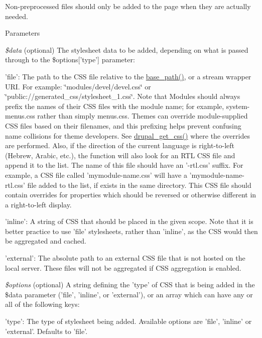 Non-\/preprocessed files should only be added to the page when they are actually needed.


\begin{DoxyParams}{Parameters}
\item[{\em \$data}](optional) The stylesheet data to be added, depending on what is passed through to the \$options\mbox{[}'type'\mbox{]} parameter:
\begin{DoxyItemize}
\item 'file': The path to the CSS file relative to the \hyperlink{common_8inc_ae227697e9c239f09fd7e36f71afde771}{base\_\-path()}, or a stream wrapper URI. For example: \char`\"{}modules/devel/devel.css\char`\"{} or \char`\"{}public://generated\_\-css/stylesheet\_\-1.css\char`\"{}. Note that Modules should always prefix the names of their CSS files with the module name; for example, system-\/menus.css rather than simply menus.css. Themes can override module-\/supplied CSS files based on their filenames, and this prefixing helps prevent confusing name collisions for theme developers. See \hyperlink{common_8inc_a2e308371f339fbb54967045ccbe4e88c}{drupal\_\-get\_\-css()} where the overrides are performed. Also, if the direction of the current language is right-\/to-\/left (Hebrew, Arabic, etc.), the function will also look for an RTL CSS file and append it to the list. The name of this file should have an '-\/rtl.css' suffix. For example, a CSS file called 'mymodule-\/name.css' will have a 'mymodule-\/name-\/rtl.css' file added to the list, if exists in the same directory. This CSS file should contain overrides for properties which should be reversed or otherwise different in a right-\/to-\/left display.
\item 'inline': A string of CSS that should be placed in the given scope. Note that it is better practice to use 'file' stylesheets, rather than 'inline', as the CSS would then be aggregated and cached.
\item 'external': The absolute path to an external CSS file that is not hosted on the local server. These files will not be aggregated if CSS aggregation is enabled. 
\end{DoxyItemize}\item[{\em \$options}](optional) A string defining the 'type' of CSS that is being added in the \$data parameter ('file', 'inline', or 'external'), or an array which can have any or all of the following keys:
\begin{DoxyItemize}
\item 'type': The type of stylesheet being added. Available options are 'file', 'inline' or 'external'. Defaults to 'file'.

\end{DoxyItemize}
\end{DoxyParams}
